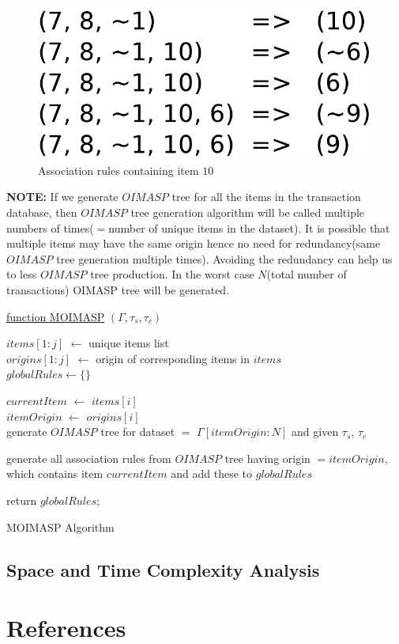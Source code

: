\documentclass[review]{elsarticle}
\begin{document}
\begin{figure}
\begin{center}
\includegraphics[scale=0.35]{pdf/arules10}
\end{center}
\caption{Association rules containing item $ 10 $}
\label{Fig 10}
\end{figure}

\textbf{NOTE:} If we generate $ OIMASP $ tree for all the items in the transaction database, then $ OIMASP $ tree generation algorithm will be called multiple numbers of times($ = $number of unique items in the dataset). It is possible that multiple items may have the same origin hence no need for redundancy(same $ OIMASP $ tree generation multiple times). Avoiding the redundancy can help us to less $ OIMASP $ tree production. In the worst case $ N $(total number of transactions) OIMASP tree will be generated.

\begin{algorithm}

    \underline{function MOIMASP} $ (\Gamma, \tau _{s}, \tau _{c}) $\;
       
    $ items[1:j] $ $ \leftarrow $ unique items list \\
    $ origins[1:j] $ $ \leftarrow $ origin of corresponding items in $ items $ \\       
    $ globalRules \leftarrow \lbrace \rbrace $
       
	  {
		$ currentItem $ $ \leftarrow $ $ items[i] $ \\
		$ itemOrigin $ $ \leftarrow $ $ origins[i] $ \\
			  	
      	  {
            generate $ OIMASP $ tree for dataset $ = $ $ \Gamma[itemOrigin:N] $ and given $ \tau _{s} $, $ 				\tau _{c} $
          }	
          
		generate all association rules from $ OIMASP $ tree having origin $ = itemOrigin $, which contains 			item $ currentItem$ and add these to $ globalRules $
	  }
	          		
	return $ globalRules $;      
    \caption{MOIMASP Algorithm}
\end{algorithm}

\subsection{Space and Time Complexity Analysis}

\section*{References}


\end{document}

